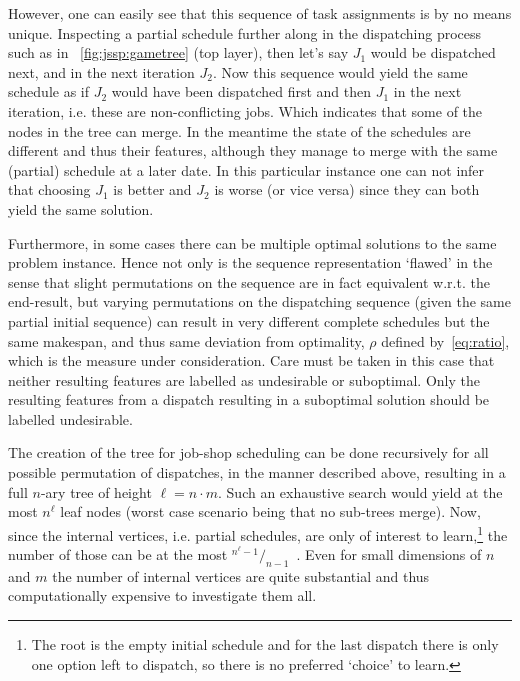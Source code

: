 \documentclass[letterpaper]{article}
\begin{document}
However, one can easily see that this sequence of task assignments is by no means unique. Inspecting a partial 
schedule further along in the dispatching process such as in ~\cref{fig:jssp:gametree} (top layer), then let's say 
$J_1$ 
would be dispatched next, and in the next iteration $J_2$. Now this sequence would yield the same schedule as if $J_2$ 
would have been dispatched first and then $J_1$ in the next iteration, i.e. these are non-conflicting jobs. Which 
indicates that some of the nodes in the tree can merge. In the meantime the state of the schedules are different and 
thus their features, although they manage to merge with the same (partial) schedule at a later date.  %
In this particular instance one can not infer that choosing $J_1$ is better and $J_2$ is worse (or vice versa) since they can both yield the same solution.


Furthermore, in some cases there can be multiple optimal solutions to the same problem instance. Hence not only is the 
sequence representation `flawed' in the sense that slight permutations on the sequence are in fact equivalent w.r.t. 
the end-result, but varying permutations on the dispatching sequence (given the same partial initial sequence) can 
result in very different complete schedules but the same makespan, and thus same deviation from optimality, $\rho$ 
defined by~\cref{eq:ratio}, which is the measure under consideration. Care must be taken in this case that neither 
resulting features are labelled as undesirable or suboptimal. Only the resulting features from a dispatch resulting in 
a suboptimal solution should be labelled undesirable. 

The creation of the tree for job-shop scheduling can be done recursively for all possible permutation of dispatches, 
in the manner described above, resulting in a full \mbox{$n$-ary} tree %
of height $\ell=n\cdot m$. Such an exhaustive search would yield at the most $n^{\ell}$ leaf nodes (worst case scenario being that no sub-trees merge). Now, since the internal vertices, i.e. partial schedules, are only of interest to learn,\footnote{The root is the empty initial schedule and for the last dispatch there is only one option left to dispatch, so there is no preferred `choice' to learn.} the number of those can be at the most \mbox{${}^{n^{\ell}-1}/_{n-1}$}~\cite{Rosen03}.
Even for small dimensions of $n$ and $m$ the number of internal vertices are quite substantial and thus 
computationally expensive to investigate them all. 
\end{document}
